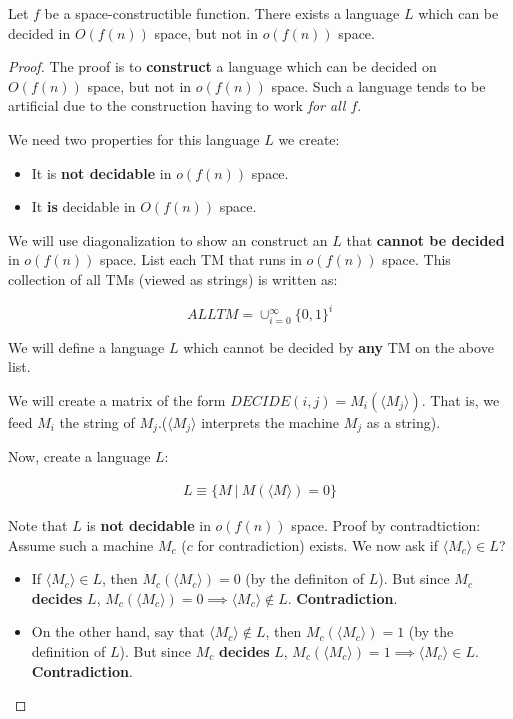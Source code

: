 \begin{theorem}
Let $f$ be a space-constructible function. There exists a language $L$ which
can be decided in $O(f(n))$ space, but not in $o(f(n))$ space.
\end{theorem}
\begin{proof}
The proof is to \textbf{construct} a language which can be decided on $O(f(n))$
space, but not in $o(f(n))$ space. Such a language tends to be artificial due
to the construction having to work \textit{for all $f$}.

We need two properties for this language $L$ we create:

\begin{itemize}
\item It is \textbf{not decidable} in $o(f(n))$ space.
\item It \textbf{is} decidable in $O(f(n))$ space.
\end{itemize}

We will use diagonalization to show an construct an $L$ that 
\textbf{cannot be decided} in $o(f(n))$ space. List each TM that runs in 
$o(f(n))$ space. This collection of all TMs (viewed as strings) is written as:

$$ALLTM = \cup_{i=0}^\infty \{0, 1\}^i$$


We will define a language $L$ which cannot be decided by \textbf{any} TM
on the above list.

We will create a matrix of the form $DECIDE(i, j) = M_i(\langle M_j \rangle)$.
That is, we feed $M_i$ the string of $M_j$.($\langle M_j \rangle$ interprets
the machine $M_j$ as a string).

Now, create a language $L$:

\begin{align*}
L \equiv \{ M~\vert~M ( \langle M \rangle ) = 0 \}
\end{align*}

Note that $L$ is \textbf{not decidable} in $o(f(n))$ space. Proof by contradtiction:
Assume such a machine $M_c$ ($c$ for contradiction) exists. We now ask if $\langle M_c \rangle \in L$?

\begin{itemize}
\item If $\langle M_c \rangle \in L$, then $M_c (\langle M_c \rangle) = 0$ (by the definiton of $L$).
But since $M_c$ \textbf{decides} $L$,
$M_c (\langle M_c \rangle) = 0 \implies  \langle M_c \rangle \notin L$. \textbf{Contradiction}.

\item On the other hand, say that $\langle M_c \rangle \notin L$, then $M_c (\langle M_c \rangle) = 1$
(by the definition of $L$).
But since $M_c$ \textbf{decides} $L$, $M_c (\langle M_c \rangle) = 1 \implies \langle M_c \rangle \in L$. 
\textbf{Contradiction}.
\end{itemize}



\end{proof}
